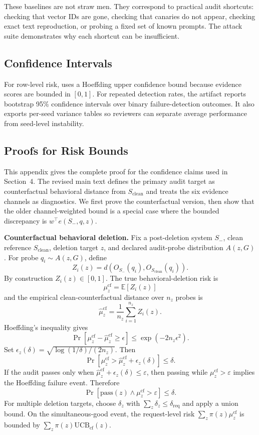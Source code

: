 These baselines are not straw men. They correspond to practical audit shortcuts: checking that vector IDs are gone, checking that canaries do not appear, checking exact text reproduction, or probing a fixed set of known prompts. The attack suite demonstrates why each shortcut can be insufficient.

\subsection{Confidence Intervals}

For row-level risk, \method{} uses a Hoeffding upper confidence bound because evidence scores are bounded in $[0,1]$. For repeated detection rates, the artifact reports bootstrap 95\% confidence intervals over binary failure-detection outcomes. It also exports per-seed variance tables so reviewers can separate average performance from seed-level instability.

\subsection{Proofs for Risk Bounds}

This appendix gives the complete proof for the confidence claims used in Section~4. The revised main text defines the primary audit target as counterfactual behavioral distance from $S_{\mathrm{clean}}$ and treats the six evidence channels as diagnostics. We first prove the counterfactual version, then show that the older channel-weighted bound is a special case where the bounded discrepancy is $w^\top e(S_-,q,z)$.

\textbf{Counterfactual behavioral deletion.}
Fix a post-deletion system $S_-$, clean reference $S_{\mathrm{clean}}$, deletion target $z$, and declared audit-probe distribution $A(z,G)$. For probe $q_i\sim A(z,G)$, define
\[
Z_i(z)=d(O_{S_-}(q_i),O_{S_{\mathrm{clean}}}(q_i)).
\]
By construction $Z_i(z)\in[0,1]$. The true behavioral-deletion risk is
\[
\mu^{\mathrm{cf}}_z=\mathbb{E}[Z_i(z)]
\]
and the empirical clean-counterfactual distance over $n_z$ probes is
\[
\hat\mu^{\mathrm{cf}}_z=\frac{1}{n_z}\sum_{i=1}^{n_z}Z_i(z).
\]
Hoeffding's inequality gives
\[
\Pr[\mu^{\mathrm{cf}}_z-\hat\mu^{\mathrm{cf}}_z\geq \epsilon]
\leq \exp(-2n_z\epsilon^2).
\]
Set $\epsilon_z(\delta)=\sqrt{\log(1/\delta)/(2n_z)}$. Then
\[
\Pr[\mu^{\mathrm{cf}}_z>
\hat\mu^{\mathrm{cf}}_z+\epsilon_z(\delta)]
\leq \delta.
\]
If the audit passes only when $\hat\mu^{\mathrm{cf}}_z+\epsilon_z(\delta)\leq\varepsilon$, then passing while $\mu^{\mathrm{cf}}_z>\varepsilon$ implies the Hoeffding failure event. Therefore
\[
\Pr[\mathrm{pass}(z)\wedge \mu^{\mathrm{cf}}_z>\varepsilon]\leq \delta.
\]
For multiple deletion targets, choose $\delta_z$ with $\sum_z\delta_z\leq\delta_{\mathrm{req}}$ and apply a union bound. On the simultaneous-good event, the request-level risk $\sum_z\pi(z)\mu^{\mathrm{cf}}_z$ is bounded by $\sum_z\pi(z)\mathrm{UCB}_{\mathrm{cf}}(z)$.


